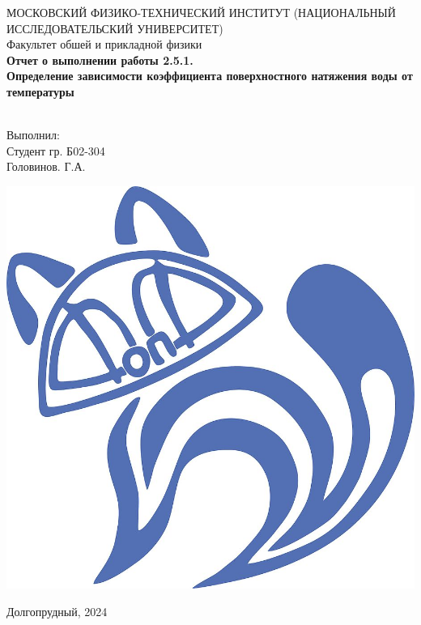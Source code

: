 \begin{titlepage}
	\begin{center}
		МОСКОВСКИЙ ФИЗИКО-ТЕХНИЧЕСКИЙ ИНСТИТУТ (НАЦИОНАЛЬНЫЙ ИССЛЕДОВАТЕЛЬСКИЙ УНИВЕРСИТЕТ) \\
		
		
		\hfill \break
		Факультет обшей и прикладной физики\\
		\vspace{2.5cm}
		\LARGE{\textbf{Отчет о выполнении работы 2.5.1. \\Определение зависимости коэффициента поверхностного натяжения воды от температуры}}\\
		\hfill \break
		\\
	\end{center}
	
	\begin{flushright}
		Выполнил:\\
		Студент гр. Б02-304\\
		Головинов. Г.А.
	\end{flushright}
	
	\vfill
	
	\begin{center}
		\includegraphics[width=0.15\linewidth]{uni}
	\end{center}
	
	\begin{center} Долгопрудный, 2024 \end{center}
	
	\thispagestyle{empty}
	
\end{titlepage}